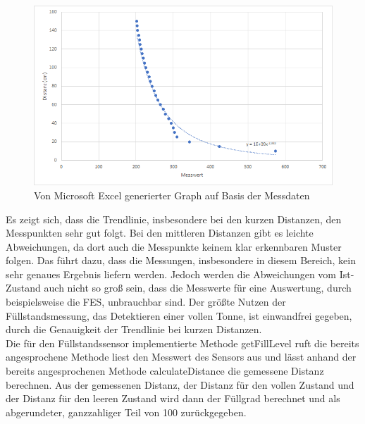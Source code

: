         \begin{figure}[H]
            \begin{center}
                \includegraphics[width=12cm]{media/03_technical_implementation/calibration.png}                
            \end{center}
            \caption{Von Microsoft Excel generierter Graph auf Basis der Messdaten}
            \label{fig:calibration}
        \end{figure}

        Es zeigt sich, dass die Trendlinie, insbesondere bei den kurzen Distanzen, den Messpunkten sehr gut folgt. Bei den mittleren Distanzen gibt es leichte Abweichungen, da dort auch die Messpunkte keinem klar erkennbaren Muster folgen. Das führt dazu, dass die Messungen, insbesondere in diesem Bereich, kein sehr genaues Ergebnis liefern werden. Jedoch werden die Abweichungen vom Ist-Zustand auch nicht so groß sein, dass die Messwerte für eine Auswertung, durch beispielsweise die FES, unbrauchbar sind. Der größte Nutzen der Füllstandsmessung, das Detektieren einer vollen Tonne, ist einwandfrei gegeben, durch die Genauigkeit der Trendlinie bei kurzen Distanzen.\\

        Die für den Füllstandssensor implementierte Methode getFillLevel ruft die bereits angesprochene Methode liest den Messwert des Sensors aus und lässt anhand der bereits angesprochenen Methode calculateDistance die gemessene Distanz berechnen. Aus der gemessenen Distanz, der Distanz für den vollen Zustand und der Distanz für den leeren Zustand wird dann der Füllgrad berechnet und als abgerundeter, ganzzahliger Teil von 100 zurückgegeben.


